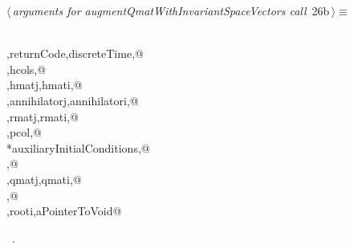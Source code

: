 \documentclass{article}
\begin{document}
\begin{flushleft} \small
\begin{minipage}{\linewidth}\label{scrap26}\raggedright\small
{} $\langle\,${\itshape arguments for augmentQmatWithInvariantSpaceVectors call}\nobreak\ {\footnotesize {26b}}$\,\rangle\equiv$
\vspace{-1ex}
\begin{list}{}{} \item
\mbox{}\verb@@\\
\mbox{}\verb@maxNumberOfHElements,returnCode,discreteTime,@\\
\mbox{}\verb@hrows,hcols,@\\
\mbox{}\verb@hmat,hmatj,hmati,@\\
\mbox{}\verb@annihilator,annihilatorj,annihilatori,@\\
\mbox{}\verb@rmat,rmatj,rmati,@\\
\mbox{}\verb@prow,pcol,@\\
\mbox{}\verb@*auxiliaryInitialConditions,@\\
\mbox{}\verb@constraintsNeeded,@\\
\mbox{}\verb@qmat,qmatj,qmati,@\\
\mbox{}\verb@essential,@\\
\mbox{}\verb@rootr,rooti,aPointerToVoid@\\
\mbox{}\verb@@{\NWsep}
\end{list}
\vspace{-1.5ex}
\footnotesize
\begin{list}{}{\setlength{\itemsep}{-\parsep}\setlength{\itemindent}{-\leftmargin}}
\item \NWtxtMacroRefIn\ .

\end{list}
\end{minipage}
\end{flushleft}
\end{document}
